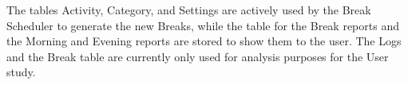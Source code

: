\documentclass{hasel_thesis}
\begin{document}
The tables Activity, Category, and Settings are actively used by the Break Scheduler to generate the new Breaks, while the table for the Break reports and the Morning and Evening reports are stored to show them to the user. The Logs and the Break table are currently only used for analysis purposes for the User study.

\end{document}
